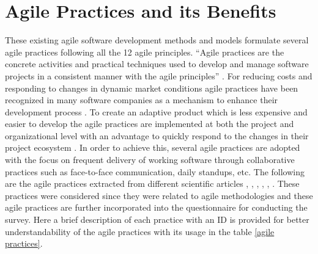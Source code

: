 \documentclass[a4paper,oneside]{bth}
\begin{document}
\section{Agile Practices and its Benefits}
These existing agile software development methods and models formulate several agile practices following all the 12 agile principles. “Agile practices are the concrete activities and practical techniques used to develop and manage software projects in a consistent manner with the agile principles” \cite{sidky_structured_2007}. For reducing costs and responding to changes in dynamic market conditions agile practices have been recognized in many software companies as a mechanism to enhance their development process \cite{pikkarainen_impact_2008}. To create an adaptive product which is less expensive and easier to develop the agile practices are implemented at both the project and organizational level with an advantage to quickly respond to the changes in their project ecosystem \cite{pikkarainen_impact_2008}. In order to achieve this, several agile practices are adopted with the focus on frequent delivery of working software through collaborative practices such as face-to-face communication, daily standups, etc. The following are the agile practices extracted from different scientific articles \cite{nawrocki_toward_2001}, \cite{moe_understanding_2008}, \cite{wang_assimilation_2012}, \cite{dyba_a_empirical_2008}, \cite{martin_agile_2003}, \cite{petersen_effect_2010}. These practices were considered since they were related to agile methodologies and these agile practices are further incorporated into the questionnaire for conducting the survey. Here a brief description of each practice with an ID is provided for better understandability of the agile practices with its usage in the table \ref{agile practices}.
\end{document}
